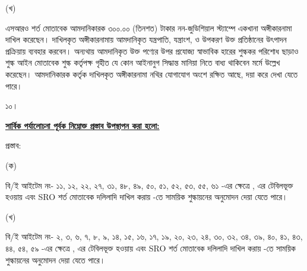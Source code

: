 \documentclass[12pt]{article}
\begin{document}
\begin{minipage}[t]{0.05\linewidth}
(খ)
\end{minipage}
\begin{minipage}[t]{0.90\linewidth}
এসআরও শর্ত মোতাবেক আমদানিকারক ৩০০.০০ (তিনশত)
টাকার নন-জুডিশিয়াল স্ট্যাম্পে একখানা অঙ্গীকারনামা
দাখিল করেছেন। দাখিলকৃত অঙ্গীকারনামায় আমদানিকৃত
যন্ত্রপাতি, যন্ত্রাংশ, ও উপকরণ
উক্ত প্রতিষ্ঠানের উৎপাদন প্রক্রিয়ায়
ব্যবহার করবেন। অন্যথায় আমদানিকৃত উক্ত পণ্যের উপর
প্রযোজ্য স্বাভাবিক হারের শুল্ককর পরিশোধ ছাড়াও
শুল্ক আইন মোতাবেক শুল্ক কর্তৃপক্ষ
গৃহীত যে কোন আইনানুগ সিদ্ধান্ত মানিয়া নিতে বাধ্য থাকিবেন
মর্মে উল্লেখ করেছেন। আমদানিকারক কর্তৃক দাখিলকৃত
অঙ্গীকারনামা নথির যোগাযোগ অংশে রক্ষিত আছে,
দয়া করে দেখা যেতে পারে।
\\
\end{minipage}
\begin{minipage}[t]{0.05\linewidth}
১০।
\end{minipage}
\begin{minipage}[t]{0.95\linewidth}
\underline{\textbf{সার্বিক পর্যালোচনা পূর্বক নিম্নোক্ত প্রস্তাব উপস্থাপন করা হলো:}}
\end{minipage}
\begin{minipage}[t]{0.05\linewidth}
\hspace{0em}
\end{minipage}
\begin{minipage}[t]{0.95\linewidth}
প্রস্তাব:
\end{minipage}
\begin{minipage}[t]{0.05\linewidth}
(ক)
\end{minipage}
\begin{minipage}[t]{0.90\linewidth}
বি/ই আইটেম নং-
১১, ১২, ২২, ২৭, ৩১, ৪৮, ৪৯, ৫০,
৫১, ৫২, ৫৩, ৫৫, ৬১
-এর ক্ষেত্রে
{\srooot}, {\sroootd}
এর টেবিলভূক্ত হওয়ায়
এবং SRO শর্ত মোতাবেক
দলিলাদি দাখিল করায়
{\cpcttz}
-তে
সাময়িক
শুল্কায়নের অনুমোদন দেয়া
যেতে পারে।
\\
\end{minipage}
\begin{minipage}[t]{0.05\linewidth}
\hspace{1em}
\end{minipage}
\begin{minipage}[t]{0.05\linewidth}
(খ)
\end{minipage}
\begin{minipage}[t]{0.90\linewidth}
বি/ই আইটেম নং-
২, ৩, ৬, ৭, ৮, ৯,
১৪, ১৫, ১৬, ১৭, ১৯, ২০, ২৩,
২৪, ৩০, ৩২, ৩৪, ৩৯, ৪০, ৪১, ৪৩, ৪৪,
৫৪, ৫৯
-এর ক্ষেত্রে
{\srootz}, {\srootzd}
এর টেবিলভূক্ত হওয়ায়
এবং SRO শর্ত মোতাবেক
দলিলাদি দাখিল করায়
{\cpcofs}
-তে
সাময়িক
শুল্কায়নের অনুমোদন দেয়া
যেতে পারে।
\\
\end{minipage}
\end{document}
